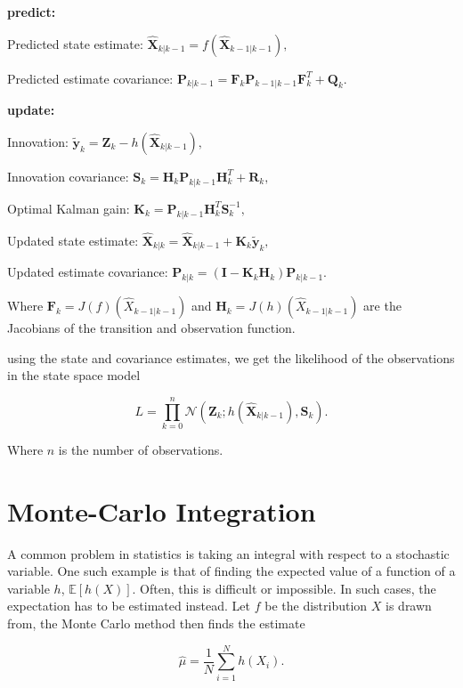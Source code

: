 \textbf{predict:}

Predicted state estimate: $\bm{\hat X}_{k|k-1} = f(\bm{\hat X}_{k-1|k-1} ),$

Predicted estimate covariance: $\textbf{P}_{k|k-1} = \textbf{F}_k\textbf{P}_{k-1|k-1} \textbf{F}_k^T + \textbf{Q}_k.$



\textbf{update:}

Innovation: $\bm{\tilde y}_{k} = \textbf{Z}_k - h(\bm{\hat X}_{k|k-1}),$

Innovation covariance: $\textbf{S}_k = \textbf{H}_k \textbf{P}_{k|k-1}\textbf{H}_k^T + \textbf{R}_k,$

Optimal Kalman gain: $\textbf{K}_k = \textbf{P}_{k|k-1} \textbf{H}_k^T \textbf{S}_k^{-1},$

Updated state estimate: $\bm{\hat X}_{k|k} = \bm{\hat X}_{k|k-1} + \textbf{K}_k \bm{\tilde y}_{k},$

Updated estimate covariance: $\textbf{P}_{k|k} = (\textbf{I} - \textbf{K}_k \textbf{H}_k)\textbf{P}_{k|k-1}.$



Where $\textbf{F}_k = J (f)(\hat{X}_{k-1|k-1})$ and $\textbf{H}_k = J( h)(\hat{X}_{k-1|k-1})$ are the Jacobians of the transition and observation function.



using the state and covariance estimates, we get the likelihood of the observations in the state space model

$$L = \prod_{k=0}^n \mathcal{N}(\textbf{Z}_k; h(\hat{\textbf{X}}_{k|k-1}), \textbf{S}_k) \label{eq: EKF likelihood}.$$

Where $n$ is the number of observations.\parencite{kulikov_extended_2024}


\section{Monte-Carlo Integration}
\label{sec: Monte Carlo integration}
A common problem in statistics is taking an integral with respect to a stochastic variable. One such example is that of finding the expected value of a function of a variable $h$, $\mathbb{E}[h(X)]$. Often, this is difficult or impossible. In such cases, the expectation has to be estimated instead. Let $f$ be the distribution $X$ is drawn from, the Monte Carlo method then finds the estimate 

\begin{equation}
\hat{\mu} = \frac{1}{N} \sum_{i=1}^N h(X_i).
\label{eq: monte carlo estimator}    
\end{equation}
  
